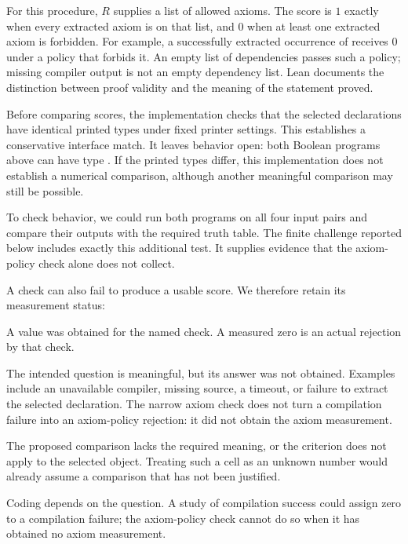 For this procedure, $R$ supplies a list of allowed axioms. The score is $1$
exactly when every extracted axiom is on that list, and $0$ when at least one
extracted axiom is forbidden. For example, a successfully extracted occurrence
of  receives $0$ under a policy that forbids it. An empty list of
dependencies passes such a policy; missing compiler output is not an empty
dependency list. Lean documents the distinction between proof validity and
the meaning of the statement proved. \cite{leanvalidation}

Before comparing scores, the implementation checks that the selected declarations have identical printed types under fixed printer settings. This establishes a conservative interface match. It leaves behavior open: both Boolean programs above can have type . If the printed types differ, this implementation does not establish a numerical comparison, although another meaningful comparison may still be possible.

To check behavior, we could run both programs on all four input pairs and compare their outputs with the required truth table. The finite challenge reported below includes exactly this additional test. It supplies evidence that the axiom-policy check alone does not collect.

A check can also fail to produce a usable score. We therefore retain its measurement status:

\begin{description}[leftmargin=1.2em,style=nextline]
\item[Measured.] A value was obtained for the named check. A measured zero is
an actual rejection by that check.
\item[Not run, missing, or uncertain.] The intended question is meaningful,
but its answer was not obtained. Examples include an unavailable compiler,
missing source, a timeout, or failure to extract the selected declaration.
The narrow axiom check does not turn a compilation failure into an axiom-policy
rejection: it did not obtain the axiom measurement.
\item[Invalid or not applicable.] The proposed comparison lacks the required
meaning, or the criterion does not apply to the selected object. Treating such
a cell as an unknown number would already assume a comparison that has not
been justified.
\end{description}

Coding depends on the question. A study of compilation success could assign zero to a compilation failure; the axiom-policy check cannot do so when it has obtained no axiom measurement.

